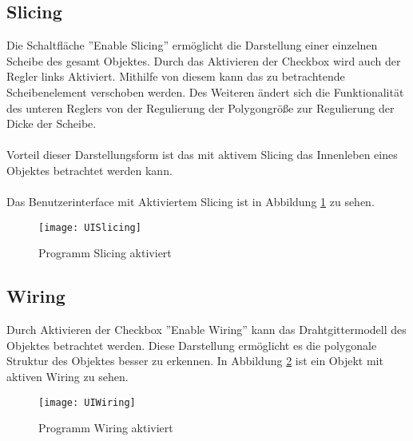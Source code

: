 \subsection{Slicing}
\label{sec:slicing}
Die Schaltfläche ''Enable Slicing'' ermöglicht die Darstellung einer einzelnen Scheibe des gesamt Objektes. Durch das Aktivieren der Checkbox wird auch der Regler links Aktiviert. Mithilfe von diesem kann das zu betrachtende Scheibenelement verschoben werden. Des Weiteren ändert sich die Funktionalität des unteren Reglers von der Regulierung der Polygongröße zur Regulierung der Dicke der Scheibe.\\
\\
Vorteil dieser Darstellungsform ist das mit aktivem Slicing das Innenleben eines Objektes betrachtet werden kann.\\
\\
Das Benutzerinterface mit Aktiviertem Slicing ist in Abbildung \ref{fig:UISlicing} zu sehen.
\begin{figure}[H]
	\centering
	\texttt{[image: UISlicing]}
	\caption{Programm Slicing aktiviert}
	\label{fig:UISlicing}
\end{figure}
\subsection{Wiring}
\label{sec:wiring}
Durch Aktivieren der Checkbox ''Enable Wiring'' kann das Drahtgittermodell des Objektes betrachtet werden. Diese Darstellung ermöglicht es die polygonale Struktur des Objektes besser zu erkennen. In Abbildung \ref{fig:UIWiring} ist ein Objekt mit aktiven Wiring zu sehen.
\begin{figure}[H]
	\centering
	\texttt{[image: UIWiring]}
	\caption{Programm Wiring aktiviert}
	\label{fig:UIWiring}
\end{figure}